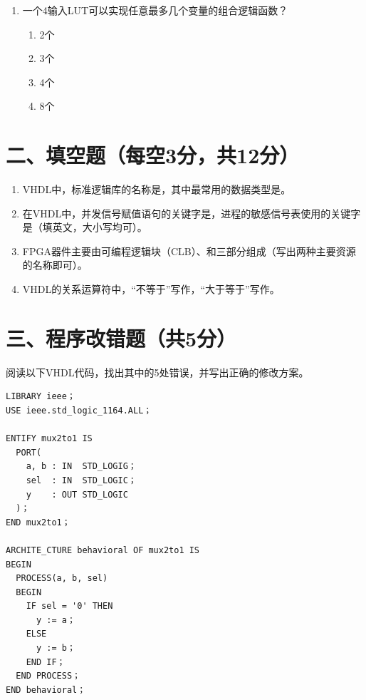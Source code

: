 \begin{enumerate}[label=\arabic*.]
\item 一个4输入LUT可以实现任意最多几个变量的组合逻辑函数？
\begin{enumerate}[label=\Alph*.]
  \item 2个
  \item 3个
  \item 4个
  \item 8个
\end{enumerate}

\end{enumerate}

\section*{二、填空题（每空3分，共12分）}

\begin{enumerate}[label=\arabic*.]
\item VHDL中，标准逻辑库的名称是\underline{\hspace{2cm}}，其中最常用的数据类型是\underline{\hspace{2cm}}。

\item 在VHDL中，并发信号赋值语句的关键字是\underline{\hspace{2cm}}，进程的敏感信号表使用的关键字是\underline{\hspace{2cm}}（填英文，大小写均可）。

\item FPGA器件主要由可编程逻辑块（CLB）、\underline{\hspace{2cm}}和\underline{\hspace{2cm}}三部分组成（写出两种主要资源的名称即可）。

\item VHDL的关系运算符中，“不等于”写作\underline{\hspace{2cm}}，“大于等于”写作\underline{\hspace{2cm}}。
\end{enumerate}

\newpage

\section*{三、程序改错题（共5分）}

阅读以下VHDL代码，找出其中的5处错误，并写出正确的修改方案。

\begin{lstlisting}[caption={存在错误的VHDL代码}]
LIBRARY ieee；
USE ieee.std_logic_1164.ALL；

ENTIFY mux2to1 IS
  PORT(
    a, b : IN  STD_LOGIG；
    sel  : IN  STD_LOGIC；
    y    : OUT STD_LOGIC
  )；
END mux2to1；

ARCHITE_CTURE behavioral OF mux2to1 IS
BEGIN
  PROCESS(a, b, sel)
  BEGIN
    IF sel = '0' THEN
      y := a；
    ELSE
      y := b；
    END IF；
  END PROCESS；
END behavioral；
\end{lstlisting}

